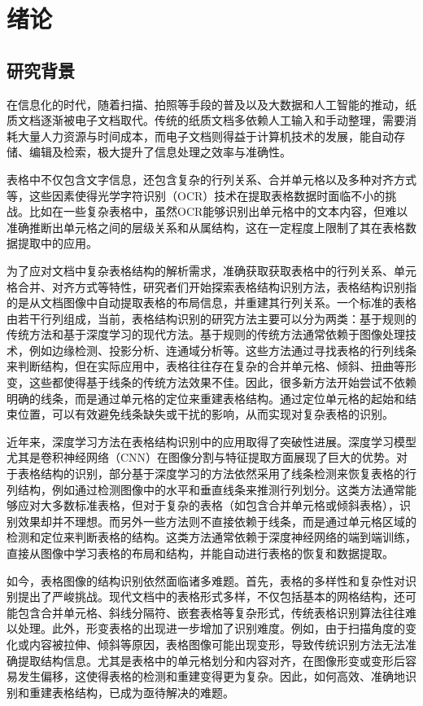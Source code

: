 \documentclass[../article.tex]{subfiles} %
\begin{document}
\section{绪论}
\subsection{研究背景}

在信息化的时代，随着扫描、拍照等手段的普及以及大数据和人工智能的推动，纸质文档逐渐被电子文档取代。传统的纸质文档多依赖人工输入和手动整理，需要消耗大量人力资源与时间成本，而电子文档则得益于计算机技术的发展，能自动存储、编辑及检索，极大提升了信息处理之效率与准确性。

表格中不仅包含文字信息，还包含复杂的行列关系、合并单元格以及多种对齐方式等，这些因素使得光学字符识别（OCR）\cite{b1, b2}技术在提取表格数据时面临不小的挑战。比如在一些复杂表格中，虽然OCR能够识别出单元格中的文本内容，但难以准确推断出单元格之间的层级关系和从属结构，这在一定程度上限制了其在表格数据提取中的应用。

为了应对文档中复杂表格结构的解析需求，准确获取获取表格中的行列关系、单元格合并、对齐方式等特性，研究者们开始探索表格结构识别方法，表格结构识别指的是从文档图像中自动提取表格的布局信息，并重建其行列关系。一个标准的表格由若干行列组成，当前，表格结构识别的研究方法主要可以分为两类：基于规则的传统方法和基于深度学习的现代方法。基于规则的传统方法通常依赖于图像处理技术，例如边缘检测、投影分析、连通域分析等\cite{b3}。这些方法通过寻找表格的行列线条来判断结构，但在实际应用中，表格往往存在复杂的合并单元格、倾斜、扭曲等形变，这些都使得基于线条的传统方法效果不佳。因此，很多新方法开始尝试不依赖明确的线条，而是通过单元格的定位来重建表格结构。通过定位单元格的起始和结束位置，可以有效避免线条缺失或干扰的影响，从而实现对复杂表格的识别。

近年来，深度学习方法在表格结构识别中的应用取得了突破性进展\cite{b3}。深度学习模型尤其是卷积神经网络（CNN）在图像分割与特征提取方面展现了巨大的优势。对于表格结构的识别，部分基于深度学习的方法依然采用了线条检测来恢复表格的行列结构，例如通过检测图像中的水平和垂直线条来推测行列划分。这类方法通常能够应对大多数标准表格，但对于复杂的表格（如包含合并单元格或倾斜表格），识别效果却并不理想。而另外一些方法则不直接依赖于线条，而是通过单元格区域的检测和定位来判断表格的结构\cite{b3}。这类方法通常依赖于深度神经网络的端到端训练，直接从图像中学习表格的布局和结构，并能自动进行表格的恢复和数据提取。

如今，表格图像的结构识别依然面临诸多难题。首先，表格的多样性和复杂性对识别提出了严峻挑战。现代文档中的表格形式多样，不仅包括基本的网格结构，还可能包含合并单元格、斜线分隔符、嵌套表格等复杂形式，传统表格识别算法往往难以处理。此外，形变表格的出现进一步增加了识别难度。例如，由于扫描角度的变化或内容被拉伸、倾斜等原因，表格图像可能出现变形，导致传统识别方法无法准确提取结构信息。尤其是表格中的单元格划分和内容对齐，在图像形变或变形后容易发生偏移，这使得表格的检测和重建变得更为复杂。因此，如何高效、准确地识别和重建表格结构，已成为亟待解决的难题。
\end{document}

